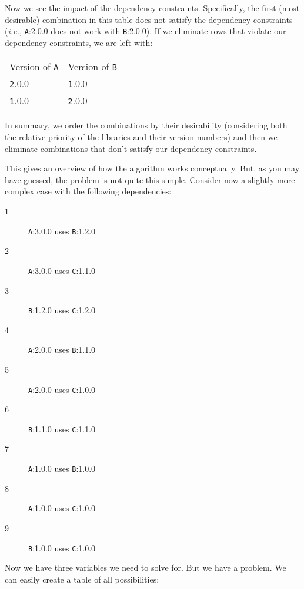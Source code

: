 \documentclass[11pt,a4paper,twocolumn]{article}
\newcommand{\code}[1]{\texttt{#1}} %
\begin{document}
Now we see the impact of the dependency constraints.  Specifically,
the first (most desirable) combination in this table does not satisfy
the dependency constraints ({\it i.e.,} {\code A:2.0.0} does not work
with {\code B:2.0.0}).  If we eliminate rows that violate our
dependency constraints, we are left with:

\begin{tabular}{ l l }
  Version of {\code A} & Version of {\code B} \\
  {\code 2.0.0} & {\code 1.0.0} \\
  {\code 1.0.0} & {\code 2.0.0} \\
\end{tabular}

In summary, we order the combinations by their desirability
(considering both the relative priority of the libraries and their
version numbers) and then we eliminate combinations that don't satisfy
our dependency constraints.

This gives an overview of how the algorithm works conceptually.  But,
as you may have guessed, the problem is not quite this simple.
Consider now a slightly more complex case with the following
dependencies:

\begin{description}
  \item[1] {\code A:3.0.0} uses {\code B:1.2.0}
  \item[2] {\code A:3.0.0} uses {\code C:1.1.0}
  \item[3] {\code B:1.2.0} uses {\code C:1.2.0}
  \item[4] {\code A:2.0.0} uses {\code B:1.1.0}
  \item[5] {\code A:2.0.0} uses {\code C:1.0.0}
  \item[6] {\code B:1.1.0} uses {\code C:1.1.0}
  \item[7] {\code A:1.0.0} uses {\code B:1.0.0}
  \item[8] {\code A:1.0.0} uses {\code C:1.0.0}
  \item[9] {\code B:1.0.0} uses {\code C:1.0.0}
\end{description}

Now we have three variables we need to solve for.  But we have a
problem.  We can easily create a table of all possibilities:
\end{document}
